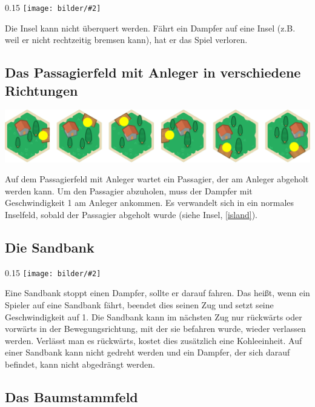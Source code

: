 \documentclass[12pt,a4paper, ngerman, oneside]{scrartcl}
\newcommand{\fieldGraphic}[2]{%
\begin{floatingfigure}[#1]{0.15\textwidth}%
  \centering
  \texttt{[image: bilder/\#2]}%
\end{floatingfigure}%
}
\begin{document}
\fieldGraphic{r}{insel}

Die Insel kann nicht überquert werden. Fährt ein Dampfer auf eine Insel (z.B.
weil er nicht rechtzeitig bremsen kann), hat er das Spiel verloren.

\paragraph{}

\subsection{\label{passenger}Das Passagierfeld mit Anleger in verschiedene Richtungen}

\includegraphics[width=\textwidth]{bilder/passagier}

Auf dem Passagierfeld mit Anleger wartet ein Passagier, der am Anleger abgeholt
werden kann. Um den Passagier abzuholen, muss der Dampfer mit Geschwindigkeit 1
am Anleger ankommen. Es verwandelt sich in ein normales Inselfeld, sobald der
Passagier abgeholt wurde (siehe Insel, \ref{island}).


\subsection{\label{sandbank}Die Sandbank}

\fieldGraphic{r}{sandbank}

Eine Sandbank stoppt einen Dampfer, sollte er darauf fahren. Das heißt, wenn ein
Spieler auf eine Sandbank fährt, beendet dies seinen Zug und setzt seine
Geschwindigkeit auf 1. Die Sandbank kann im nächsten Zug nur rückwärts oder
vorwärts in der Bewegungsrichtung, mit der sie befahren wurde, wieder verlassen
werden. Verlässt man es rückwärts, kostet dies zusätzlich eine Kohleeinheit. Auf
einer Sandbank kann nicht gedreht werden und ein Dampfer, der sich darauf
befindet, kann nicht abgedrängt werden.

\paragraph{}

\subsection{Das Baumstammfeld}
\end{document}
